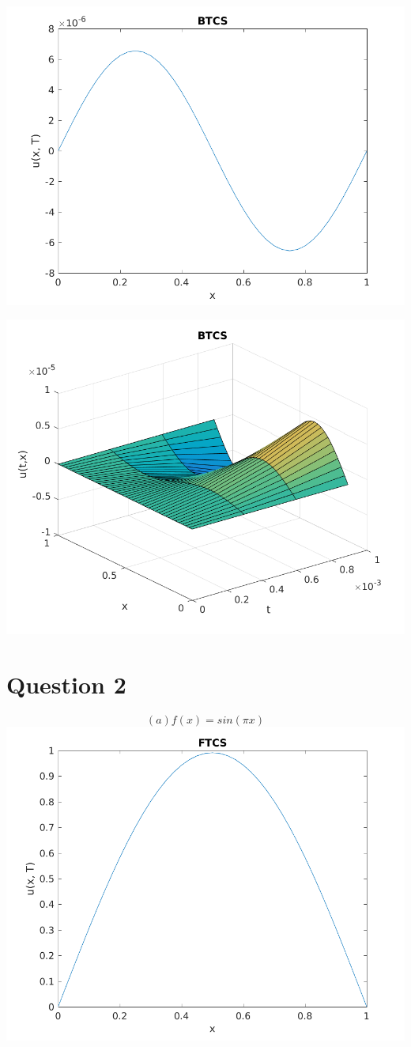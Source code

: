 \documentclass{article}
\begin{document}
\includegraphics{"q1_3"}
\pagebreak

\includegraphics{"q1_4"}
\pagebreak


\section{Question 2}

\[(a) f (x) = sin(\pi x)\]
\includegraphics{"q2_1"}
\pagebreak
\end{document}
